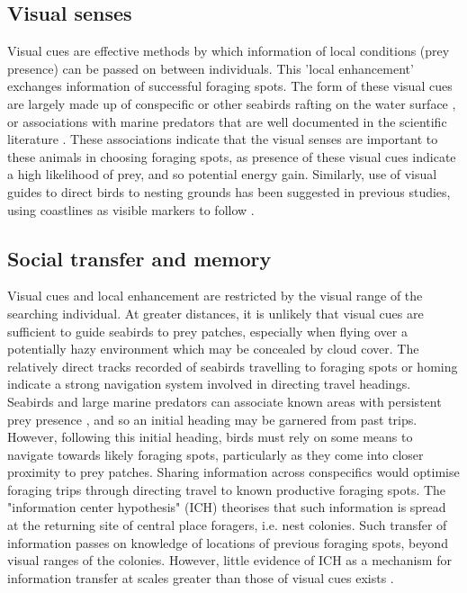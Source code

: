 \documentclass[9pt,twocolumn,twoside,lineno]{pnas-new}
\begin{document}
\subsection{Visual senses}
Visual cues are effective methods by which information of local conditions (prey presence) can be passed on between individuals. This 'local enhancement' exchanges information of successful foraging spots. The form of these visual cues are largely made up of conspecific or other seabirds rafting on the water surface \citep{Weimerskirch_2010b}, or associations with marine predators that are well documented in the scientific literature \citep{Nevitt_1999, Sakamoto_2009a, Silverman_2004, Thiebot_2012}. These associations indicate that the visual senses are important to these animals in choosing foraging spots, as presence of these visual cues indicate a high likelihood of prey, and so potential energy gain. Similarly, use of visual guides to direct birds to nesting grounds has been suggested in previous studies, using coastlines as visible markers to follow \citep{Pollonara_2015,Yamamoto_2008}.

\subsection{Social transfer and memory}
Visual cues and local enhancement are restricted by the visual range of the searching individual. At greater distances, it is unlikely that visual cues are sufficient to guide seabirds to prey patches, especially when flying over a potentially hazy environment which may be concealed by cloud cover. The relatively direct tracks recorded of seabirds travelling to foraging spots or homing \citep{Weimerskirch_2007b,Pollonara_2015} indicate a strong navigation system involved in directing travel headings. Seabirds and large marine predators can associate known areas with persistent prey presence \citep{Davoren_2013}, and so an initial heading may be garnered from past trips. However, following this initial heading, birds must rely on some means to navigate towards likely foraging spots, particularly as they come into closer proximity to prey patches. Sharing information across conspecifics would optimise foraging trips through directing travel to known productive foraging spots. The "information center hypothesis" (ICH) theorises that such information is spread at the returning site of central place foragers, i.e. nest colonies. Such transfer of information passes on knowledge of locations of previous foraging spots, beyond visual ranges of the colonies. However, little evidence of ICH as a mechanism for information transfer at scales greater than those of visual cues exists \citep{Davoren_2003}.
\end{document}
